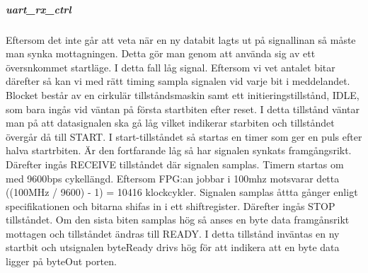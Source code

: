 \documentclass[a4paper]{scrartcl}
\begin{document}
		\subparagraph{uart\_rx\_ctrl}
		Eftersom det inte går att veta när en ny databit lagts ut på signallinan så måste man synka mottagningen. Detta gör man genom att använda sig av ett översnkommet startläge. I detta fall låg signal. Eftersom vi vet antalet bitar därefter så kan 		vi med rätt timing sampla signalen vid varje bit i meddelandet.
		Blocket består av en cirkulär tillståndsmaskin samt ett initieringstillstånd, IDLE, som bara ingås vid väntan på första startbiten efter reset. I detta tillstånd väntar man på att datasignalen ska gå låg vilket indikerar starbiten och tillståndet övergår 		då till START.
		I start-tillståndet så startas en timer som ger en puls efter halva startrbiten. Är den fortfarande låg så har signalen synkats framgångsrikt. Därefter ingås RECEIVE tillståndet där signalen samplas. Timern startas om med 9600bps cykellängd. 			Eftersom FPG:an jobbar i 100mhz motsvarar detta ((100MHz / 9600) - 1) = 10416 klockcykler.
		Signalen samplas åttta gånger enligt specifikationen och bitarna shifas in i ett shiftregister. Därefter ingås STOP tillståndet. Om den sista biten samplas hög så anses en byte data framgånsrikt mottagen och tillståndet ändras till READY. I detta 			tillstånd inväntas en ny startbit och utsignalen byteReady drivs hög för att indikera att en byte data ligger på byteOut porten.
\end{document}
